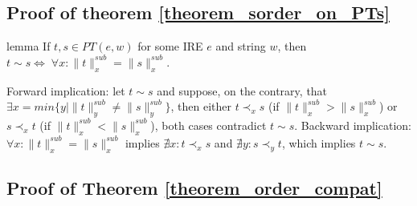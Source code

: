 \documentclass[AMA,STIX1COL]{WileyNJD-v2}
\newcommand{\PT}{PT}
\newcommand{\snorm}[2]{\|{#1}\|^{sub}_{#2}}
\begin{document}


\subsection*{Proof of theorem \ref{theorem_sorder_on_PTs}}

\begin{theoremEnd}{lemma}
    \label{lemma_incomparability_equivdef}
    If $t, s \in \PT(e, w)$ for some IRE $e$ and string $w$,
    then $t \sim s \Leftrightarrow \; \forall x : \snorm{t}{x} = \snorm{s}{x}$.
\end{theoremEnd}
\begin{proofEnd}
    Forward implication: let $t \sim s$ and suppose, on the contrary, that $\exists x = min \{ y \mid \snorm{t}{y} \neq \snorm{s}{y} \}$,
    then either $t \prec_x s$ (if $\snorm{t}{x} > \snorm{s}{x}$) or $s \prec_x t$ (if $\snorm{t}{x} < \snorm{s}{x}$),
    both cases contradict $t \sim s$.
    Backward implication: $\forall x : \snorm{t}{x} = \snorm{s}{x}$
    implies $\nexists x : t \prec_x s$ and $\nexists y : s \prec_y t$,
    which implies $t \sim s$.
\end{proofEnd}



\subsection*{Proof of Theorem \ref{theorem_order_compat}}
\end{document}
